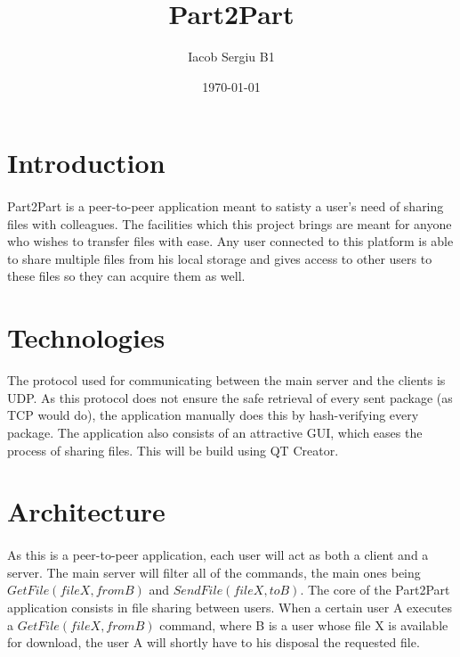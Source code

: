 \documentclass[paper=a4, fontsize=11pt]{scrartcl}
\title{Part2Part}
\author{Iacob Sergiu B1}
\date{\normalsize\today}
\begin{document}
\maketitle

\newpage

\section{Introduction}

\paragraph{}
Part2Part is a peer-to-peer application meant to satisty a user's need of sharing files with colleagues. The facilities which this project brings are meant for anyone who wishes to transfer files with ease.
Any user connected to this platform is able to share multiple files from his local storage and gives access to other users to these files so they can acquire them as well.

\section{Technologies}
The protocol used for communicating between the main server and the clients is UDP. As this protocol does not ensure the safe retrieval of every sent package (as TCP would do), the application manually does this by hash-verifying every package.
The application also consists of an attractive GUI, which eases the process of sharing files. This will be build using  QT Creator.


\paragraph{}


\section{Architecture}
\paragraph{}
As this is a peer-to-peer application, each user will act as both a client and a server.
The main server will filter all of the commands, the main ones being $GetFile(file X, from B)$ and $SendFile (file X, to B)$.
The core of the Part2Part application consists in file sharing between users. When a certain user A executes a $GetFile(file X, from B)$ command, where B is a user whose file X is available for download, the user A will shortly have to his disposal the requested file.
\end{document}
